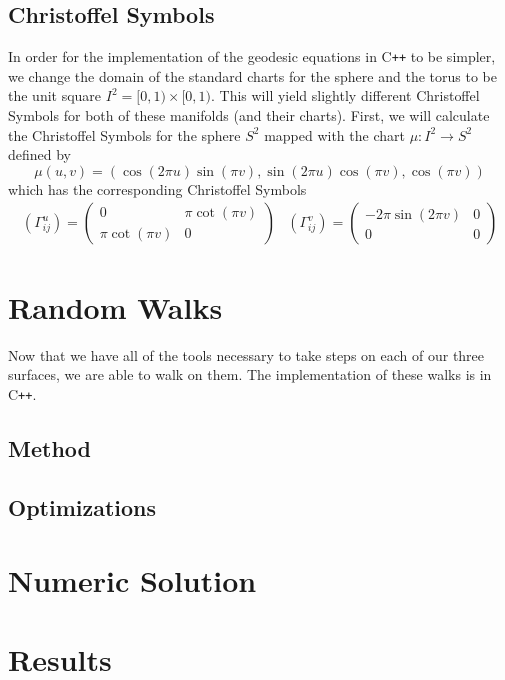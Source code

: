 \documentclass{article}
\begin{document}
	\subsection{Christoffel Symbols}
		In order for the implementation of the geodesic equations in C\texttt{++} to be simpler, we change the domain of the standard charts for the sphere and the torus to be the unit square $I^2 = [0,1) \times [0,1)$.
		This will yield slightly different Christoffel Symbols for both of these manifolds (and their charts).
		First, we will calculate the Christoffel Symbols for the sphere $S^2$ mapped with the chart $\mu:I^2 \to S^2$ defined by
		$$ \mu(u,v) = (\cos(2\pi u)\sin(\pi v), \sin(2\pi u)\cos(\pi v), \cos(\pi v)) $$
		which has the corresponding Christoffel Symbols
		\begin{equation}
			\begin{array}{lr}
			\left(\Gamma^{u}_{ij}\right) = \left( \begin{array}{cc}
					0 & \pi\cot(\pi v) \\
					\pi\cot(\pi v) & 0
				\end{array} \right) &
			\left(\Gamma^{v}_{ij}\right) = \left( \begin{array}{cc}
					-2\pi\sin(2\pi v) & 0 \\
					0 & 0
				\end{array} \right)
			\end{array}
		\end{equation}
	
\section{Random Walks}
	Now that we have all of the tools necessary to take steps on each of our three surfaces, we are able to walk on them.
	The implementation of these walks is in C\texttt{++}.
	
	\subsection{Method}
	
	\subsection{Optimizations}

\section{Numeric Solution}

\section{Results}



\end{document}
